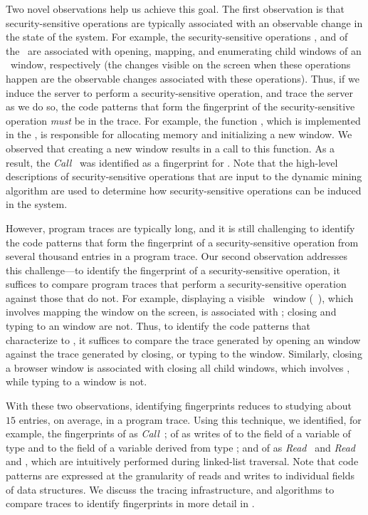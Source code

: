 Two novel observations help us achieve this goal. The first observation is that
security-sensitive operations are typically associated with an observable
change in the state of the system. For example, the security-sensitive
operations ,  and  of
the \xserver\ are associated with opening, mapping, and enumerating child
windows of an \xclient\ window, respectively (the changes visible on the screen
when these operations happen are the observable changes associated with these
operations).  Thus, if we induce the server to perform a security-sensitive
operation, and trace the server as we do so, the code patterns that form the
fingerprint of the security-sensitive operation \textit{must} be in the trace.
For example, the function , which is implemented in the
\xserver, is responsible for allocating memory and initializing a new window.
We observed that creating a new window results in a call to this function. As a
result, the \textit{Call}~ was identified as a fingerprint
for .  Note that the high-level descriptions of
security-sensitive operations that are input to the dynamic mining algorithm
are used to determine how security-sensitive operations can be induced in the
system.

However, program traces are typically long, and it is still challenging to
identify the code patterns that form the fingerprint of a security-sensitive
operation from several thousand entries in a program trace. Our second
observation addresses this challenge---to identify the fingerprint of a
security-sensitive operation, it suffices to compare program traces that
perform a security-sensitive operation against those that do not.  For example,
displaying a visible \xclient\ window (\eg~), which involves
mapping the window on the screen, is associated with ; closing
and typing to an  window are not.  Thus, to identify the code
patterns that characterize to , it suffices to compare the
trace generated by opening an  window against the trace generated
by closing, or typing to the window. Similarly, closing a browser window is
associated with closing all child windows, which involves
, while typing to a window is not.

With these two observations, identifying fingerprints reduces to studying about
$15$ entries, on average, in a program trace. Using this technique, we
identified, for example, the fingerprints of  as
\textit{Call}~; of  as writes of 
to the field  of a variable of type  and
 to the field  of a variable derived from type
; and of  as
\textit{Read}~ and
\textit{Read}~ and , which
are intuitively performed during linked-list traversal. Note that code patterns
are expressed at the granularity of reads and writes to individual fields of
data structures. We discuss the tracing infrastructure, and algorithms to
compare traces to identify fingerprints in more detail in
.


